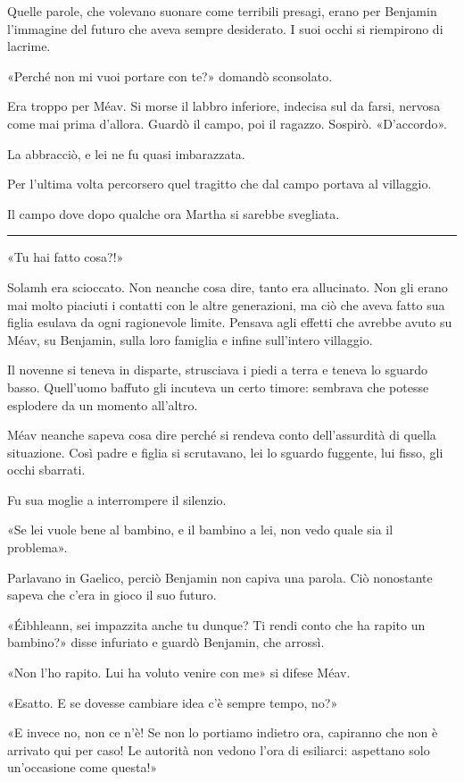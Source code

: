 Quelle parole, che volevano suonare come terribili presagi, erano per Benjamin l'immagine del futuro
che aveva sempre desiderato. I suoi occhi si riempirono di lacrime.

«Perché non mi vuoi portare con te?» domandò sconsolato.

Era troppo per Méav. Si morse il labbro inferiore, indecisa sul da farsi, nervosa come mai prima
d'allora. Guardò il campo, poi il ragazzo. Sospirò. «D'accordo».

La abbracciò, e lei ne fu quasi imbarazzata.

Per l'ultima volta percorsero quel tragitto che dal campo portava al villaggio.

Il campo dove dopo qualche ora Martha si sarebbe svegliata.

\plainbreak{1}

«Tu hai fatto cosa?!»

Solamh era scioccato. Non neanche cosa dire, tanto era allucinato. Non gli erano mai molto piaciuti
i contatti con le altre generazioni, ma ciò che aveva fatto sua figlia esulava da ogni ragionevole
limite. Pensava agli effetti che avrebbe avuto su Méav, su Benjamin, sulla loro famiglia e infine
sull'intero villaggio.

Il novenne si teneva in disparte, strusciava i piedi a terra e teneva lo sguardo basso. Quell'uomo
baffuto gli incuteva un certo timore: sembrava che potesse esplodere da un momento all'altro.

Méav neanche sapeva cosa dire perché si rendeva conto dell'assurdità di quella situazione. Così
padre e figlia si scrutavano, lei lo sguardo fuggente, lui fisso, gli occhi sbarrati.

Fu sua moglie a interrompere il silenzio.

«Se lei vuole bene al bambino, e il bambino a lei, non vedo quale sia il problema».

Parlavano in Gaelico, perciò Benjamin non capiva una parola. Ciò nonostante sapeva che c'era in
gioco il suo futuro.

«Éibhleann, sei impazzita anche tu dunque? Ti rendi conto che ha rapito un bambino?» disse infuriato
e guardò Benjamin, che arrossì.

«Non l'ho rapito. Lui ha voluto venire con me» si difese Méav.

«Esatto. E se dovesse cambiare idea c'è sempre tempo, no?»

«E invece no, non ce n'è! Se non lo portiamo indietro ora, capiranno che non è arrivato qui per
caso! Le autorità non vedono l'ora di esiliarci: aspettano solo un'occasione come questa!»

